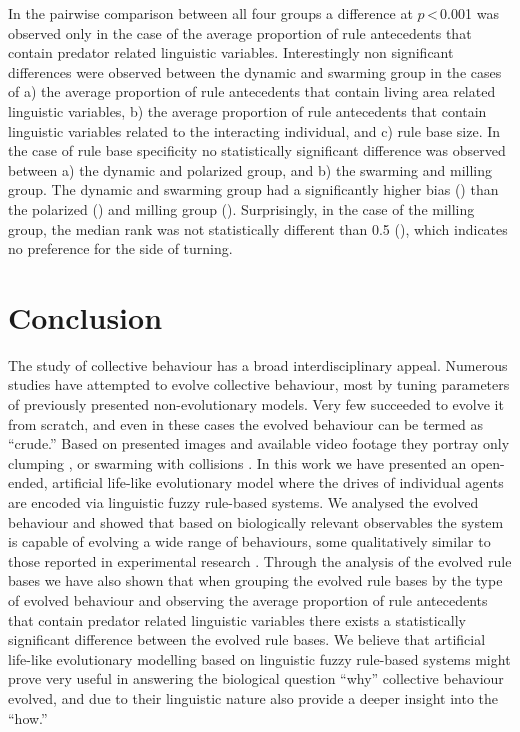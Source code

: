In the pairwise comparison between all four groups a difference at $p$\,\textless\,\num{0.001} was observed only in the case of the average proportion of rule antecedents that contain predator related linguistic variables. Interestingly non significant differences were observed between the dynamic and swarming group in the cases of a) the average proportion of rule antecedents that contain living area related linguistic variables, b) the average proportion of rule antecedents that contain linguistic variables related to the interacting individual, and c) rule base size. In the case of rule base specificity no statistically significant difference was observed between a) the dynamic and polarized group, and b) the swarming and milling group. The dynamic and swarming group had a significantly higher bias () than the polarized () and milling group (). Surprisingly, in the case of the milling group, the median rank was not statistically different than \num{0.5} (), which indicates no preference for the side of turning.

\section{Conclusion}

The study of collective behaviour has a broad interdisciplinary appeal. Numerous studies have attempted to evolve collective behaviour, most by tuning parameters of previously presented non-evolutionary models. Very few succeeded to evolve it from scratch, and even in these cases the evolved behaviour can be termed as ``crude.'' Based on presented images and available video footage they portray only clumping \cite{biswas2014causes,witkowski2016emergence}, or swarming with collisions \cite{olson2013critical,olson2013predator,olson2016evolution,witkowski2016emergence}.
In this work we have presented an open-ended, artificial life-like evolutionary model where the drives of individual agents are encoded via linguistic fuzzy rule-based systems. We analysed the evolved behaviour and showed that based on biologically relevant observables \cite{couzin2002collective,tunstrom2013collective,vicsek2012collective} the system is capable of evolving a wide range of behaviours, some qualitatively similar to those reported in experimental research \cite{tunstrom2013collective}. Through the analysis of the evolved rule bases we have also shown that when grouping the evolved rule bases by the type of evolved behaviour and observing the average proportion of rule antecedents that contain predator related linguistic variables there exists a statistically significant difference between the evolved rule bases.
We believe that artificial life-like evolutionary modelling based on linguistic fuzzy rule-based systems might prove very useful in answering the biological question ``why'' collective behaviour evolved, and due to their linguistic nature also provide a deeper insight into the ``how.''

